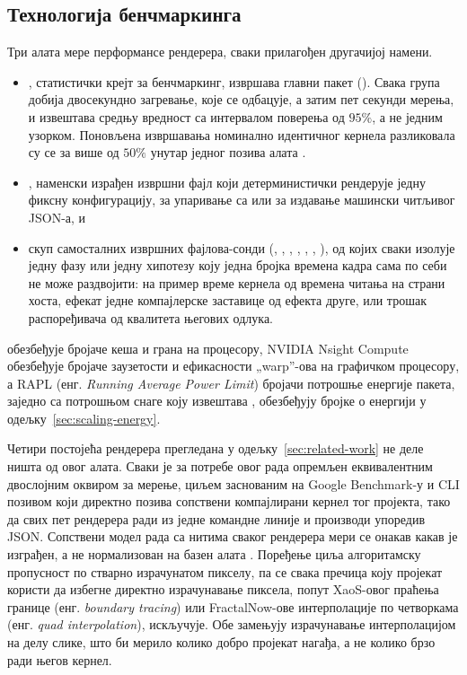 \documentclass[serbian]{ftndiplomski}
\begin{document}
\subsection{Технологија бенчмаркинга}
\label{sec:benchmarking-tech}

Три алата мере перформансе рендерера, сваки прилагођен другачијој намени.
\begin{itemize}
  \item {}, статистички крејт за бенчмаркинг, извршава главни пакет
  (). Свака група добија двосекундно загревање, које се
  одбацује, а затим пет секунди мерења, и извештава средњу вредност са интервалом
  поверења од $95\%$, а не једним узорком. Поновљена извршавања номинално
  идентичног кернела разликовала су се за више од $50\%$ унутар једног позива алата
  .
  \item {}, наменски израђен извршни фајл који детерминистички
  рендерује једну фиксну конфигурацију, за упаривање са  или за
  издавање машински читљивог JSON-а, и
  \item скуп самосталних извршних фајлова-сонди (,
  , , ,
  , , ), од којих сваки
  изолује једну фазу или једну хипотезу коју једна бројка времена кадра сама по себи
  не може раздвојити: на пример време кернела од времена читања на страни хоста,
  ефекат једне компајлерске заставице од ефекта друге, или трошак распоређивача од
  квалитета његових одлука.
\end{itemize}
 обезбеђује бројаче кеша и грана на процесору, NVIDIA Nsight Compute
обезбеђује бројаче заузетости и ефикасности „warp''-ова на графичком процесору, а
RAPL (енг. \emph{Running Average Power Limit}) бројачи потрошње енергије пакета, заједно са потрошњом снаге коју извештава
, обезбеђују бројке о енергији у одељку~\ref{sec:scaling-energy}.

Четири постојећа рендерера прегледана у одељку~\ref{sec:related-work} не деле ништа
од овог алата. Сваки је за потребе овог рада опремљен еквивалентним двослојним
оквиром за мерење, циљем  заснованим на Google Benchmark-у и
CLI позивом  који директно позива сопствени компајлирани кернел
тог пројекта, тако да свих пет рендерера ради из једне командне линије и производи
упоредив JSON. Сопствени модел рада са нитима сваког рендерера мери се онакав какав је
изграђен, а не нормализован на базен алата . Поређење циља алгоритамску
пропусност по стварно израчунатом пикселу, па се свака пречица коју пројекат користи
да избегне директно израчунавање пиксела, попут XaoS-овог праћења границе
(енг. \emph{boundary tracing}) или FractalNow-ове интерполације по четворкама
(енг. \emph{quad interpolation}), искључује. Обе замењују израчунавање интерполацијом на
делу слике, што би мерило колико добро пројекат нагађа, а не колико брзо ради његов
кернел.
\end{document}
